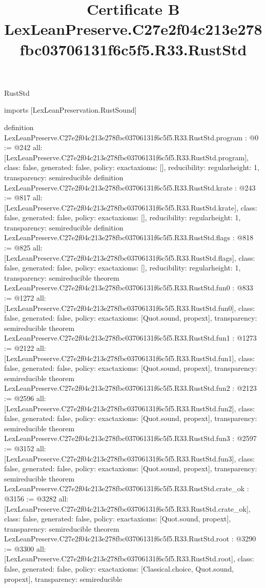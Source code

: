 \begin{lexlean}{RustStd}
\title{Certificate B LexLeanPreserve.C27e2f04c213e278fbc03706131f6c5f5.R33.RustStd}
\begin{coremodule}
imports [LexLeanPreservation.RustSound]

definition LexLeanPreserve.C27e2f04c213e278fbc03706131f6c5f5.R33.RustStd.program : @0 := @242 {
  all: [LexLeanPreserve.C27e2f04c213e278fbc03706131f6c5f5.R33.RustStd.program],
  class: false,
  generated: false,
  policy: exact{axioms: []},
  reducibility: regular{height: 1},
  transparency: semireducible
}
definition LexLeanPreserve.C27e2f04c213e278fbc03706131f6c5f5.R33.RustStd.krate : @243 := @817 {
  all: [LexLeanPreserve.C27e2f04c213e278fbc03706131f6c5f5.R33.RustStd.krate],
  class: false,
  generated: false,
  policy: exact{axioms: []},
  reducibility: regular{height: 1},
  transparency: semireducible
}
definition LexLeanPreserve.C27e2f04c213e278fbc03706131f6c5f5.R33.RustStd.flags : @818 := @825 {
  all: [LexLeanPreserve.C27e2f04c213e278fbc03706131f6c5f5.R33.RustStd.flags],
  class: false,
  generated: false,
  policy: exact{axioms: []},
  reducibility: regular{height: 1},
  transparency: semireducible
}
theorem LexLeanPreserve.C27e2f04c213e278fbc03706131f6c5f5.R33.RustStd.fun0 : @833 := @1272 {
  all: [LexLeanPreserve.C27e2f04c213e278fbc03706131f6c5f5.R33.RustStd.fun0],
  class: false,
  generated: false,
  policy: exact{axioms: [Quot.sound, propext]},
  transparency: semireducible
}
theorem LexLeanPreserve.C27e2f04c213e278fbc03706131f6c5f5.R33.RustStd.fun1 : @1273 := @2122 {
  all: [LexLeanPreserve.C27e2f04c213e278fbc03706131f6c5f5.R33.RustStd.fun1],
  class: false,
  generated: false,
  policy: exact{axioms: [Quot.sound, propext]},
  transparency: semireducible
}
theorem LexLeanPreserve.C27e2f04c213e278fbc03706131f6c5f5.R33.RustStd.fun2 : @2123 := @2596 {
  all: [LexLeanPreserve.C27e2f04c213e278fbc03706131f6c5f5.R33.RustStd.fun2],
  class: false,
  generated: false,
  policy: exact{axioms: [Quot.sound, propext]},
  transparency: semireducible
}
theorem LexLeanPreserve.C27e2f04c213e278fbc03706131f6c5f5.R33.RustStd.fun3 : @2597 := @3152 {
  all: [LexLeanPreserve.C27e2f04c213e278fbc03706131f6c5f5.R33.RustStd.fun3],
  class: false,
  generated: false,
  policy: exact{axioms: [Quot.sound, propext]},
  transparency: semireducible
}
theorem LexLeanPreserve.C27e2f04c213e278fbc03706131f6c5f5.R33.RustStd.crate_ok : @3156 := @3282 {
  all: [LexLeanPreserve.C27e2f04c213e278fbc03706131f6c5f5.R33.RustStd.crate_ok],
  class: false,
  generated: false,
  policy: exact{axioms: [Quot.sound, propext]},
  transparency: semireducible
}
theorem LexLeanPreserve.C27e2f04c213e278fbc03706131f6c5f5.R33.RustStd.root : @3290 := @3300 {
  all: [LexLeanPreserve.C27e2f04c213e278fbc03706131f6c5f5.R33.RustStd.root],
  class: false,
  generated: false,
  policy: exact{axioms: [Classical.choice, Quot.sound, propext]},
  transparency: semireducible
}


\end{coremodule}
\end{lexlean}
